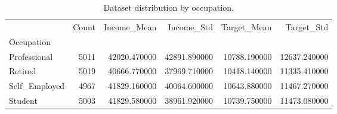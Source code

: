 \begin{table}
\caption{Dataset distribution by occupation.}
\label{tab:occupation}
\begin{tabular}{lrrrrr}
\toprule
 & Count & Income\_Mean & Income\_Std & Target\_Mean & Target\_Std \\
Occupation &  &  &  &  &  \\
\midrule
Professional & 5011 & 42020.470000 & 42891.890000 & 10788.190000 & 12637.240000 \\
Retired & 5019 & 40666.770000 & 37969.710000 & 10418.140000 & 11335.410000 \\
Self\_Employed & 4967 & 41829.160000 & 40064.600000 & 10643.880000 & 11467.270000 \\
Student & 5003 & 41829.580000 & 38961.920000 & 10739.750000 & 11473.080000 \\
\bottomrule
\end{tabular}
\end{table}
